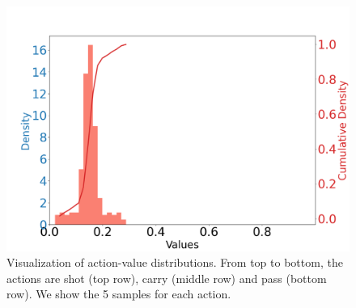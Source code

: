 \documentclass{article}
\begin{document}
\begin{figure}[htbp]
\begin{minipage}{0.195\textwidth}
    \includegraphics[scale=0.08]{figures/pass_density_idx_255_XCoord:-96.37_YCoord:-6.29.png}
    \end{minipage}
    \caption{Visualization of action-value distributions. From top to bottom, the actions are shot (top row), carry (middle row) and pass (bottom row). We show the 5 samples for each action.}
\end{figure}
\end{document}
